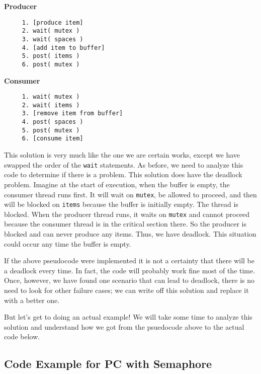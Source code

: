 \begin{multicols}{2}
	\textbf{Producer}\vspace{-2em}
	\begin{verbatim}
	 1. [produce item]
	 2. wait( mutex )
	 3. wait( spaces )
	 4. [add item to buffer]
	 5. post( items )
	 6. post( mutex )
  \end{verbatim}
	\columnbreak
	\textbf{Consumer}\vspace{-2em}
	\begin{verbatim}
	 1. wait( mutex )
	 2. wait( items )
	 3. [remove item from buffer]
	 4. post( spaces )
	 5. post( mutex )
	 6. [consume item]
  \end{verbatim}
\end{multicols}
\vspace{-2em}

This solution is very much like the one we are certain works, except we have swapped the order of the \texttt{wait} statements. As before, we need to analyze this code to determine if there is a problem. This solution does have the deadlock problem. Imagine at the start of execution, when the buffer is empty, the consumer thread runs first. It will wait on \texttt{mutex}, be allowed to proceed, and then will be blocked on \texttt{items} because the buffer is initially empty. The thread is blocked. When the producer thread runs, it waits on \texttt{mutex} and cannot proceed because the consumer thread is in the critical section there. So the producer is blocked and can never produce any items. Thus, we have deadlock. This situation could occur any time the buffer is empty.

If the above pseudocode were implemented it is not a certainty that there will be a deadlock every time. In fact, the code will probably work fine most of the time. Once, however, we have found one scenario that can lead to deadlock, there is no need to look for other failure cases; we can write off this solution and replace it with a better one.

But let's get to doing an actual example! We will take some time to analyze this solution and understand how we got from the psuedocode above to the actual code below.

\subsection*{Code Example for PC with Semaphore}

